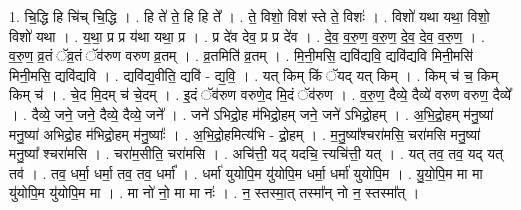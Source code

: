 \documentclass[17pt]{extarticle}
\begin{document}
1. चि॒द्धि हि चि॑च् चि॒द्धि । . हि ते॑ ते॒ हि हि ते᳚ । . ते॒ विशो॒ विश॑ स्ते ते॒ विशः॑ । . विशो॑ यथा यथा॒ विशो॒ विशो॑ यथा । . य॒था॒ प्र प्र य॑था यथा॒ प्र । . प्र दे॑व देव॒ प्र प्र दे॑व । . दे॒व॒ व॒रु॒ण॒ व॒रु॒ण॒ दे॒व॒ दे॒व॒ व॒रु॒ण॒ । . व॒रु॒ण॒ व्र॒तं ॅव्र॒तं ॅव॑रुण वरुण व्र॒तम् । . व्र॒तमिति॑ व्र॒तम् । . मि॒नी॒मसि॒ द्यवि॑द्यवि॒ द्यवि॑द्यवि मिनी॒मसि॑ मिनी॒मसि॒ द्यवि॑द्यवि । . द्यवि॑द्य॒वीति॒ द्यवि॑ - द्य॒वि॒ । . यत् किम् किं ॅयद् यत् किम् । . किम् च॑ च॒ किम् किम् च॑ । . चे॒द मि॒दम् च॑ चे॒दम् । . इ॒दं ॅव॑रुण वरुणे॒द मि॒दं ॅव॑रुण । . व॒रु॒ण॒ दैव्ये॒ दैव्ये॑ वरुण वरुण॒ दैव्ये᳚ । . दैव्ये॒ जने॒ जने॒ दैव्ये॒ दैव्ये॒ जने᳚ । . जने॑ ऽभिद्रो॒ह म॑भिद्रो॒हम् जने॒ जने॑ ऽभिद्रो॒हम् । . अ॒भि॒द्रो॒हम् म॑नु॒ष्या॑ मनु॒ष्या॑ अभिद्रो॒ह म॑भिद्रो॒हम् म॑नु॒ष्याः᳚ । . अ॒भि॒द्रो॒हमित्य॑भि - द्रो॒हम् । . म॒नु॒ष्या᳚श्चरा॑मसि॒ चरा॑मसि मनु॒ष्या॑ मनु॒ष्या᳚ श्चरा॑मसि । . चरा॑म॒सीति॒ चरा॑मसि । . अचि॑त्ती॒ यद् यदचि॒ त्त्यचि॑त्ती॒ यत् । . यत् तव॒ तव॒ यद् यत् तव॑ । . तव॒ धर्मा॒ धर्मा॒ तव॒ तव॒ धर्मा᳚ । . धर्मा॑ युयोपि॒म यु॑योपि॒म धर्मा॒ धर्मा॑ युयोपि॒म । . यु॒यो॒पि॒म मा मा यु॑योपि॒म यु॑योपि॒म मा । . मा नो॑ नो॒ मा मा नः॑ । . न॒ स्तस्मा॒त् तस्मा᳚न् नो न॒ स्तस्मा᳚त् । \newline
\end{document}
